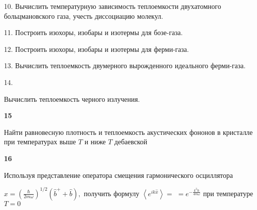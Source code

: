 \documentclass[a4paper,12pt]{article} %
\begin{document}
\begin{ttask}

10. Вычислить температурную зависимость теплоемкости двухатомного больцмановского газа, учесть диссоциацию молекул. 





\end{ttask}


\begin{ttask}

11. Построить изохоры, изобары и изотермы для бозе-газа. 



\end{ttask}


\begin{ttask}

12. Построить изохоры, изобары и изотермы для ферми-газа. 


\end{ttask}


\begin{ttask}

13. Вычислить теплоемкость двумерного вырожденного идеального ферми-газа. 





\end{ttask}


\begin{ttask}14. 

Вычислить теплоемкость черного излучения. 




 

\end{ttask}


\begin{ttask}\textbf{15}

Найти равновесную плотность и теплоемкость акустических фононов в кристалле при температурах выше $ T $  и ниже $ T $  дебаевской




\end{ttask}


\begin{ttask}\textbf{16}

Используя представление оператора смещения гармонического осциллятора 

$\hat{x}=\left(\frac{\hbar}{2 m \omega}\right)^{1 / 2}\left(\hat{b}^{+}+\hat{b}\right),$ 
получить формулу $\left\langle e^{i k \hat{x}}\right\rangle=$
$=e^{-\frac{k^{2} \hbar}{4 m \omega}}$ при температуре $T=0$





\end{ttask}
\end{document}
